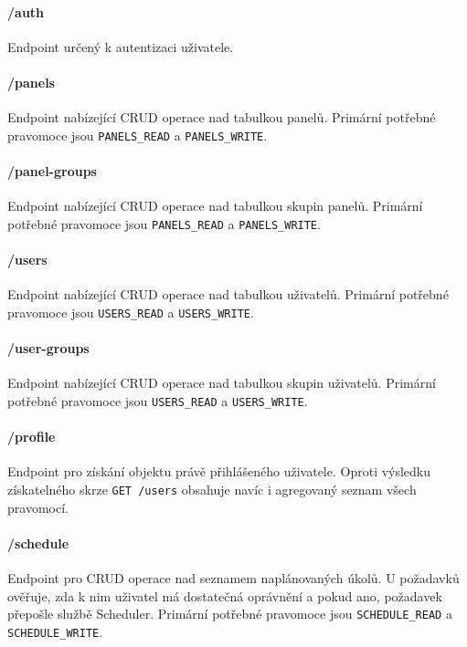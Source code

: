 \paragraph*{/auth}
Endpoint určený k autentizaci uživatele.

\paragraph*{/panels}
Endpoint nabízející CRUD operace nad tabulkou panelů. Primární potřebné pravomoce jsou \lstinline{PANELS_READ} a \lstinline{PANELS_WRITE}.

\paragraph*{/panel-groups}
Endpoint nabízející CRUD operace nad tabulkou skupin panelů. Primární potřebné pravomoce jsou \lstinline{PANELS_READ} a \lstinline{PANELS_WRITE}.

\paragraph*{/users}
Endpoint nabízející CRUD operace nad tabulkou uživatelů. Primární potřebné pravomoce jsou \lstinline{USERS_READ} a \lstinline{USERS_WRITE}.

\paragraph*{/user-groups}
Endpoint nabízející CRUD operace nad tabulkou skupin uživatelů. Primární potřebné pravomoce jsou \lstinline{USERS_READ} a \lstinline{USERS_WRITE}.

\paragraph*{/profile}
Endpoint pro získání objektu právě přihlášeného uživatele. Oproti výsledku získatelného skrze \lstinline|GET /users| obsahuje navíc i agregovaný seznam všech pravomocí.

\paragraph*{/schedule}
Endpoint pro CRUD operace nad seznamem naplánovaných úkolů. U požadavků ověřuje, zda k nim uživatel má dostatečná oprávnění a pokud ano, požadavek přepošle službě Scheduler. Primární potřebné pravomoce jsou \lstinline{SCHEDULE_READ} a \lstinline{SCHEDULE_WRITE}.

